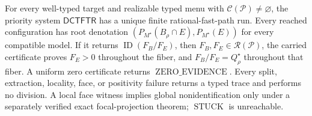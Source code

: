 For every well-typed target and realizable typed menu with \(\mathcal C(\mathcal P)\ne\varnothing\), the priority system \(\mathsf{DCTFTR}\) has a unique finite rational-fast-path run.  Every reached configuration has root denotation \((P_{M^\star}(B_\rho\cap E),P_{M^\star}(E))\) for every compatible model.  If it returns \(\operatorname{ID}(F_B/F_E)\), then \(F_B,F_E\in\mathscr R(\mathcal P)\), the carried certificate proves \(F_E>0\) throughout the fiber, and \(F_B/F_E=Q_\rho^\star\) throughout that fiber.  A uniform zero certificate returns \(\operatorname{ZERO\_EVIDENCE}\).  Every split, extraction, locality, face, or positivity failure returns a typed trace and performs no division.  A local face witness implies global nonidentification only under a separately verified exact focal-projection theorem; \(\operatorname{STUCK}\) is unreachable.
